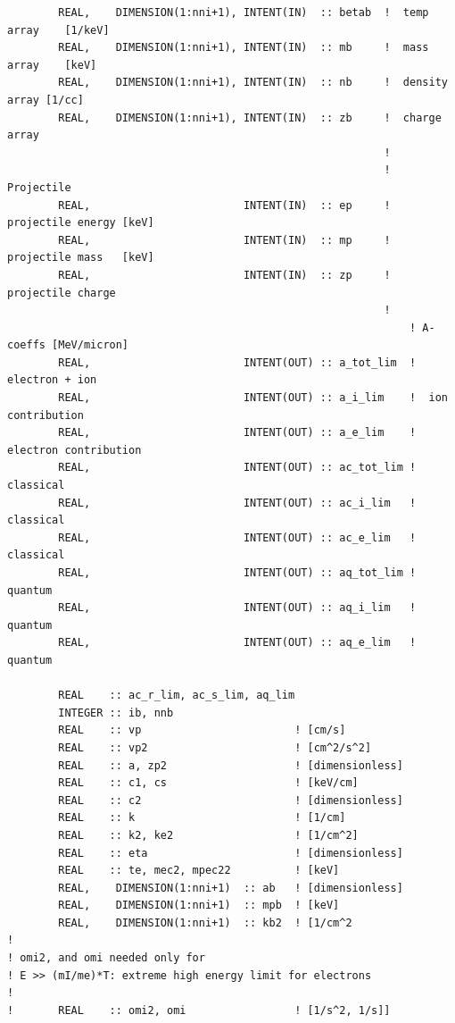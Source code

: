 \documentclass[preprint,12pt,eqsecnum,nofootinbib,amsmath,amssymb]{revtex4}
\begin{document}
{{\begin{verbatim}
        REAL,    DIMENSION(1:nni+1), INTENT(IN)  :: betab  !  temp array    [1/keV]
        REAL,    DIMENSION(1:nni+1), INTENT(IN)  :: mb     !  mass array    [keV]
        REAL,    DIMENSION(1:nni+1), INTENT(IN)  :: nb     !  density array [1/cc]
        REAL,    DIMENSION(1:nni+1), INTENT(IN)  :: zb     !  charge array
                                                           !
                                                           ! Projectile  
        REAL,                        INTENT(IN)  :: ep     !  projectile energy [keV]
        REAL,                        INTENT(IN)  :: mp     !  projectile mass   [keV]
        REAL,                        INTENT(IN)  :: zp     !  projectile charge
                                                           !
                                                               ! A-coeffs [MeV/micron]
        REAL,                        INTENT(OUT) :: a_tot_lim  !  electron + ion
        REAL,                        INTENT(OUT) :: a_i_lim    !  ion contribution
        REAL,                        INTENT(OUT) :: a_e_lim    !  electron contribution
        REAL,                        INTENT(OUT) :: ac_tot_lim !  classical
        REAL,                        INTENT(OUT) :: ac_i_lim   !  classical
        REAL,                        INTENT(OUT) :: ac_e_lim   !  classical
        REAL,                        INTENT(OUT) :: aq_tot_lim !  quantum
        REAL,                        INTENT(OUT) :: aq_i_lim   !  quantum
        REAL,                        INTENT(OUT) :: aq_e_lim   !  quantum

        REAL    :: ac_r_lim, ac_s_lim, aq_lim
        INTEGER :: ib, nnb
        REAL    :: vp                        ! [cm/s]
        REAL    :: vp2                       ! [cm^2/s^2]
        REAL    :: a, zp2                    ! [dimensionless]
        REAL    :: c1, cs                    ! [keV/cm]
        REAL    :: c2                        ! [dimensionless]
        REAL    :: k                         ! [1/cm]
        REAL    :: k2, ke2                   ! [1/cm^2]
        REAL    :: eta                       ! [dimensionless]
        REAL    :: te, mec2, mpec22          ! [keV] 
        REAL,    DIMENSION(1:nni+1)  :: ab   ! [dimensionless]
        REAL,    DIMENSION(1:nni+1)  :: mpb  ! [keV]
        REAL,    DIMENSION(1:nni+1)  :: kb2  ! [1/cm^2
!
! omi2, and omi needed only for 
! E >> (mI/me)*T: extreme high energy limit for electrons
!
!       REAL    :: omi2, omi                 ! [1/s^2, 1/s]]


\end{verbatim}}}
\end{document}
